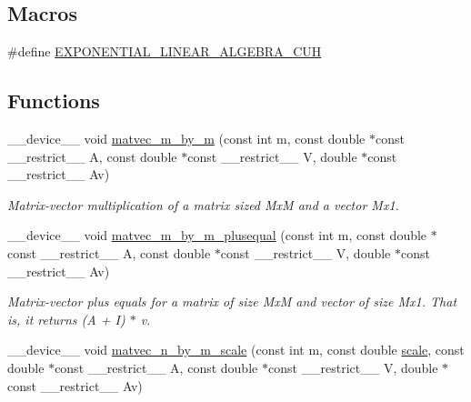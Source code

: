 \subsection*{Macros}
\begin{DoxyCompactItemize}
\item 
\#define \hyperlink{exponential__linear__algebra_8cuh_a681edd700cfabbc96d9bafca7cc69049}{E\+X\+P\+O\+N\+E\+N\+T\+I\+A\+L\+\_\+\+L\+I\+N\+E\+A\+R\+\_\+\+A\+L\+G\+E\+B\+R\+A\+\_\+\+C\+UH}
\end{DoxyCompactItemize}
\subsection*{Functions}
\begin{DoxyCompactItemize}
\item 
\+\_\+\+\_\+device\+\_\+\+\_\+ void \hyperlink{exponential__linear__algebra_8cuh_a2e59348b99908b5918de88097e15d5ff}{matvec\+\_\+m\+\_\+by\+\_\+m} (const int m, const double $\ast$const \+\_\+\+\_\+restrict\+\_\+\+\_\+ A, const double $\ast$const \+\_\+\+\_\+restrict\+\_\+\+\_\+ V, double $\ast$const \+\_\+\+\_\+restrict\+\_\+\+\_\+ Av)
\begin{DoxyCompactList}\small\item\em Matrix-\/vector multiplication of a matrix sized MxM and a vector Mx1. \end{DoxyCompactList}\item 
\+\_\+\+\_\+device\+\_\+\+\_\+ void \hyperlink{exponential__linear__algebra_8cuh_a6bc7e5c08b8e40b19ce05ea146c05307}{matvec\+\_\+m\+\_\+by\+\_\+m\+\_\+plusequal} (const int m, const double $\ast$const \+\_\+\+\_\+restrict\+\_\+\+\_\+ A, const double $\ast$const \+\_\+\+\_\+restrict\+\_\+\+\_\+ V, double $\ast$const \+\_\+\+\_\+restrict\+\_\+\+\_\+ Av)
\begin{DoxyCompactList}\small\item\em Matrix-\/vector plus equals for a matrix of size MxM and vector of size Mx1. That is, it returns (A + I) $\ast$ v. \end{DoxyCompactList}\item 
\+\_\+\+\_\+device\+\_\+\+\_\+ void \hyperlink{exponential__linear__algebra_8cuh_a03e37312683db492dc73e08c17fe40e7}{matvec\+\_\+n\+\_\+by\+\_\+m\+\_\+scale} (const int m, const double \hyperlink{radau2a_8cu_a4fab5866449108992478041d2e51a28c}{scale}, const double $\ast$const \+\_\+\+\_\+restrict\+\_\+\+\_\+ A, const double $\ast$const \+\_\+\+\_\+restrict\+\_\+\+\_\+ V, double $\ast$const \+\_\+\+\_\+restrict\+\_\+\+\_\+ Av)

\end{DoxyCompactItemize}
